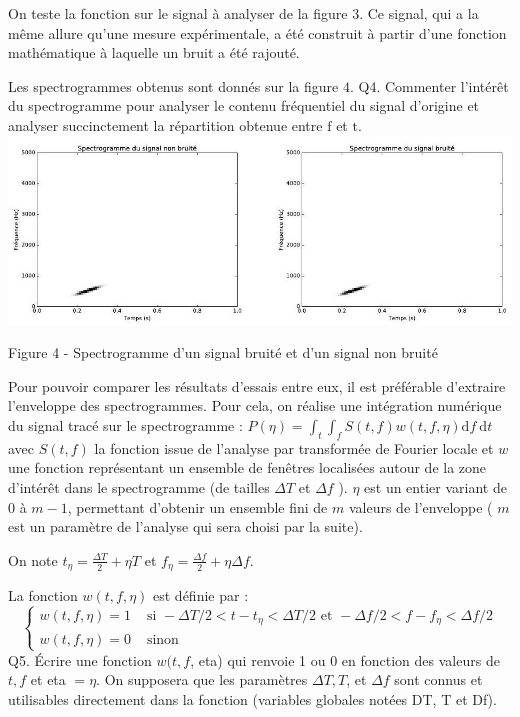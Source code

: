 \documentclass[10pt]{article}
\begin{document}
On teste la fonction sur le signal à analyser de la figure 3. Ce signal, qui a la même allure qu'une mesure expérimentale, a été construit à partir d'une fonction mathématique à laquelle un bruit a été rajouté.

Les spectrogrammes obtenus sont donnés sur la figure $4 .$ Q4. Commenter l'intérêt du spectrogramme pour analyser le contenu fréquentiel du signal d'origine et analyser succinctement la répartition obtenue entre $\mathrm{f}$ et $\mathrm{t}$.\\

\includegraphics[max width=\textwidth]{2022_02_02_1af495ea60fb42b668bfg-06}

Figure 4 - Spectrogramme d'un signal bruité et d'un signal non bruité

Pour pouvoir comparer les résultats d'essais entre eux, il est préférable d'extraire l'enveloppe des spectrogrammes. Pour cela, on réalise une intégration numérique du signal tracé sur le spectrogramme : $P(\eta)=\int_{t} \int_{f} S(t, f) w(t, f, \eta) \mathrm{d} f \mathrm{~d} t$ avec $S(t, f)$ la fonction issue de l'analyse par transformée de Fourier locale et $w$ une fonction représentant un ensemble de fenêtres localisées autour de la zone d'intérêt dans le spectrogramme (de tailles $\Delta T$ et $\Delta f$ ). $\eta$ est un entier variant de 0 à $m-1$, permettant d'obtenir un ensemble fini de $m$ valeurs de l'enveloppe ( $m$ est un paramètre de l'analyse qui sera choisi par la suite).

On note $t_{\eta}=\frac{\Delta T}{2}+\eta T$ et $f_{\eta}=\frac{\Delta f}{2}+\eta \Delta f$.

La fonction $w(t, f, \eta)$ est définie par :
$$
\begin{cases}w(t, f, \eta)=1 & \text { si }-\Delta T / 2<t-t_{\eta}<\Delta T / 2 \text { et }-\Delta f / 2<f-f_{\eta}<\Delta f / 2 \\ w(t, f, \eta)=0 & \text { sinon }\end{cases}
$$
Q5. Écrire une fonction $w(t, f$, eta) qui renvoie 1 ou 0 en fonction des valeurs de $t, f$ et eta $=\eta$. On supposera que les paramètres $\Delta T, T$, et $\Delta f$ sont connus et utilisables directement dans la fonction (variables globales notées DT, T et Df).
\end{document}
